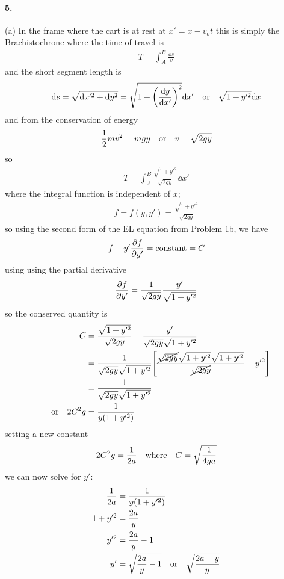 \documentclass[../hw.tex]{subfiles}
\begin{document}
\newpage
\paragraph*{5.} (a) 
In the frame where the cart is at rest at $x' = x - v_o t$ this is simply the Brachistochrone
where the time of travel is 
\begin{align*}
    T = \int_A^B \frac{\dd s}{v}
\end{align*}
and the short segment length is
\begin{align*}
    \dd s = \sqrt{\dd x'^2 + \dd y^2} = \sqrt{1 + \qt(\dv{y}{x'})^2} \dd x' \qor \sqrt{1 + y'^2} \dd x
\end{align*}
and from the conservation of energy
\begin{align*}
    \frac{1}{2} m v^2 = mgy \qor v = \sqrt{2gy}
\end{align*}
so
\begin{align*}
    T = \int_A^B \frac{\sqrt{1 + y'^2}}{\sqrt{2gy}} \dd x'
\end{align*}
where the integral function is independent of $x$;
\begin{align*}
    f = f(y, y') = \frac{\sqrt{1 + y'^2}}{\sqrt{2gy}}
\end{align*} so using the second form of 
the EL equation from Problem 1b, we have
\begin{align*}
    f - y' \pdv{f}{y'} = \mathrm{constant} = C
\end{align*}
using using the partial derivative
\begin{align*}
    \pdv{f}{y'} = \frac{1}{\sqrt{2gy}} \frac{y'}{\sqrt{1 + y'^2}}
\end{align*}
so the conserved quantity is
\begin{align*}
    C &= \frac{\sqrt{1 + y'^2}}{\sqrt{2gy}} - \frac{y'}{\sqrt{2gy}\sqrt{1 + y'^2}} \\
    &= \frac{1}{\sqrt{2gy}\sqrt{1 + y'^2}}
        \qt[\frac{\cancel{\sqrt{2gy}} \sqrt{1 + y'^2} \sqrt{1 + y'^2}}{\cancel{\sqrt{2gy}}}
        - y'^2] \\
    &= \frac{1}{\sqrt{2gy}\sqrt{1 + y'^2}} \\
    \qor 2C^2g &= \frac{1}{y(1 + y'^2)}
\end{align*}
setting a new constant 
\begin{align*}
    2C^2 g = \frac{1}{2a} \qqtext{where} C = \sqrt{\frac{1}{4ga}}
\end{align*}
we can now solve for $y'$:
\begin{align*}
    \frac{1}{2a} &= \frac{1}{y(1 + y'^2)} \\
    1 + y'^2 &= \frac{2a}{y} \\
    y'^2 &= \frac{2a}{y} - 1 \\
    y' &= \sqrt{\frac{2a}{y} - 1} \qor \sqrt{\frac{2a - y}{y}}
\end{align*}
\end{document}
